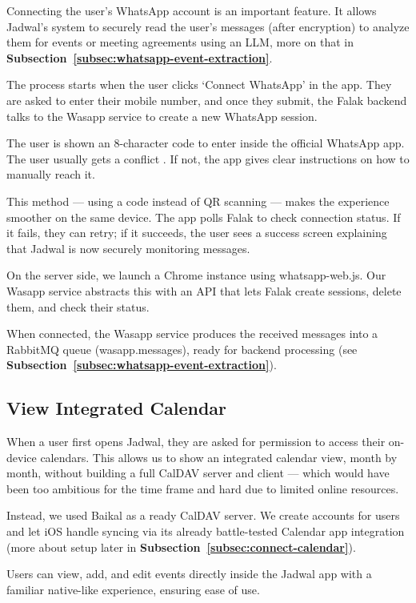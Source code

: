 Connecting the user's WhatsApp account is an important feature. It allows Jadwal's system to securely read the user's messages (after encryption) to analyze them for events or meeting agreements using an LLM, more on that in \textbf{Subsection~\ref{subsec:whatsapp-event-extraction}}.

The process starts when the user clicks `Connect WhatsApp' in the app. They are asked to enter their mobile number, and once they submit, the Falak backend talks to the Wasapp service to create a new WhatsApp session.

The user is shown an 8-character code to enter inside the official WhatsApp app. The user usually gets a conflict . If not, the app gives clear instructions on how to manually reach it.

This method — using a code instead of QR scanning — makes the experience smoother on the same device. The app polls Falak to check connection status. If it fails, they can retry; if it succeeds, the user sees a success screen explaining that Jadwal is now securely monitoring messages.

On the server side, we launch a Chrome instance using whatsapp-web.js. Our Wasapp service abstracts this with an API that lets Falak create sessions, delete them, and check their status.

When connected, the Wasapp service produces the received messages into a RabbitMQ queue (wasapp.messages), ready for backend processing (see \textbf{Subsection~\ref{subsec:whatsapp-event-extraction}}).

\subsection{View Integrated Calendar}

When a user first opens Jadwal, they are asked for permission to access their on-device calendars. This allows us to show an integrated calendar view, month by month, without building a full CalDAV server and client — which would have been too ambitious for the time frame and hard due to limited online resources.

Instead, we used Baikal as a ready CalDAV server. We create accounts for users and let iOS handle syncing via its already battle-tested Calendar app integration (more about setup later in \textbf{Subsection~\ref{subsec:connect-calendar}}).

Users can view, add, and edit events directly inside the Jadwal app with a familiar native-like experience, ensuring ease of use.

